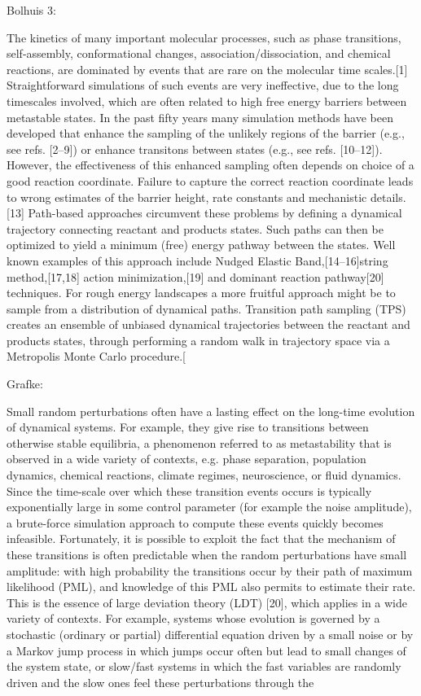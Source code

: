 \documentclass[]{cam-thesis}
\begin{document}
Bolhuis 3:

The kinetics of many important molecular processes, such as phase transitions, self-assembly, conformational changes, association/dissociation, and chemical reactions, are dominated
by events that are rare on the molecular time scales.[1] Straightforward simulations of such events are very ineffective, due to the long timescales involved, which are often related to high free energy barriers between metastable states. In the past fifty years many simulation methods have been developed that enhance the sampling of the unlikely regions of the barrier (e.g., see refs. [2–9]) or enhance transitons between states (e.g., see refs. [10–12]). However, the effectiveness of this enhanced sampling often depends on choice of a good reaction coordinate. Failure to capture the correct reaction coordinate leads to wrong estimates of the barrier height, rate constants and mechanistic details.[13] Path-based approaches circumvent these problems by defining a dynamical trajectory connecting reactant and products states. Such paths can then be optimized to yield a minimum (free) energy pathway between the states. Well known examples of this approach include Nudged Elastic Band,[14–16]string method,[17,18] action minimization,[19] and dominant reaction pathway[20] techniques. For rough energy landscapes a more fruitful approach might be to sample from a distribution of dynamical paths. Transition path sampling (TPS) creates an ensemble of unbiased dynamical trajectories between the reactant and products states, through performing a random walk in trajectory space via a Metropolis Monte Carlo procedure.[


Grafke:

Small random perturbations often have a lasting effect on the long-time evolution of dynamical systems. For example, they give rise to transitions between otherwise stable equilibria, a phenomenon referred to as metastability that is observed in a wide variety of contexts, e.g. phase separation, population dynamics, chemical reactions, climate regimes, neuroscience, or fluid dynamics. Since the time-scale over which these transition events occurs is typically exponentially large in some control parameter (for example the noise amplitude), a brute-force simulation approach to compute these events quickly becomes infeasible. Fortunately, it is possible to exploit the fact that the mechanism of these transitions is often predictable when the random perturbations have small amplitude: with high probability the transitions occur by their path of maximum likelihood (PML), and knowledge of this PML also permits to estimate their rate. This is the essence of large deviation theory (LDT) [20], which applies in a wide variety of contexts. For example, systems whose evolution is governed by a stochastic (ordinary or partial) differential equation driven by a small noise or by a Markov jump process in which jumps occur often but lead to small changes of the system state, or slow/fast systems in which the fast variables are randomly driven and the slow ones feel these perturbations through the
\end{document}
